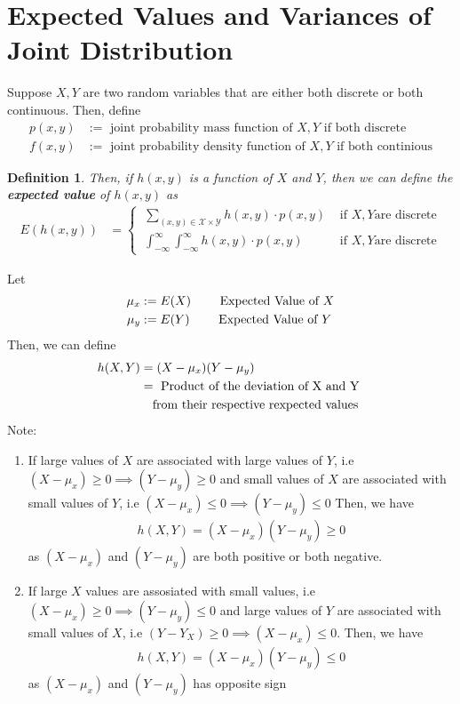 \documentclass[11pt,oneside]{book}
\theoremstyle{newStyle}
\newtheorem{defn}[thm]{Definition}
\newcommand{\note}{\color{red}Note: \color{black}}
\begin{document}
\section[Expected Values and Covariances of Joint Distribution]{Expected Values and Variances of Joint Distribution}
Suppose $X,Y$ are two random variables that are either both discrete or both continuous. Then, define \begin{align*}
p(x,y)&:=\text{ joint probability mass function of }X,Y\text{ if both discrete}\\
f(x,y)&:=\text{ joint probability density function of }X,Y\text{ if both continious}
\end{align*}
\begin{defn}
Then, if $h(x,y)$ is a function of $X$ and $Y$, then we can define the \textbf{expected value} of $h(x,y)$ as\begin{align*}
E(h(x,y))&=\begin{cases}
\displaystyle\ \sum_{(x,y)\in \mathcal{X}\times \mathcal{Y}}h(x,y)\cdot p(x,y)&\text{ if }X,Y \text{are discrete}\\
\displaystyle\ \int_{-\infty}^{\infty}\int_{-\infty}^{\infty}h(x,y)\cdot p(x,y)&\text{ if }X,Y \text{are discrete}
\end{cases}
\end{align*}
\end{defn}
Let  \begin{align*}
\mu_x&:=E(X)\text{ \qquad Expected Value of }X\\
\mu_y&:=E(Y)\text{ \qquad Expected Value of }Y
\end{align*}
Then, we can define \begin{align*}
h(X,Y)&=(X-\mu_x)(Y-\mu_y)\\
&=\text{ Product of the deviation of X and Y }\\
&\text{\quad from their respective rexpected values}
\end{align*}
\note \begin{enumerate}
\item If large values of $X$ are associated with large values of $Y$, i.e $(X-\mu_x)\geq 0\implies (Y-\mu_y)\geq 0$ and small values of $X$ are associated with small values of $Y$, i.e $(X-\mu_x)\leq 0\implies (Y-\mu_y)\leq 0$
Then, we have \begin{align*}
h(X,Y)=(X-\mu_x)(Y-\mu_y)\geq 0
\end{align*}
as $(X-\mu_x)$ and $(Y-\mu_y)$ are both positive or both negative.
\item If large $X$ values are assosiated with small values, i.e $(X-\mu_x)\geq 0\implies (Y-\mu_y)\leq 0$ and large values of $Y$ are associated with small values of $X$, i.e $(Y-Y_X)\geq 0\implies (X-\mu_x)\leq 0$. Then, we have \begin{align*}
h(X,Y)=(X-\mu_x)(Y-\mu_y)\leq 0
\end{align*}
as $(X-\mu_x)$ and $(Y-\mu_y)$ has opposite sign
\end{enumerate}
\end{document}

